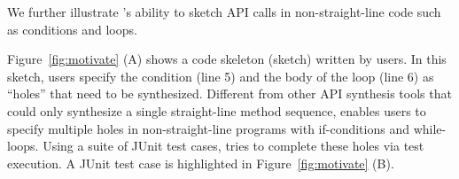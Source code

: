 We further illustrate \tool's ability to  sketch API calls in non-straight-line code such as conditions and loops.  


Figure~\ref{fig:motivate} (A)  shows a code skeleton (sketch) written by users. In this sketch, users specify the  condition (line 5) and the body of the  loop (line 6)  as ``holes'' that need to be synthesized. %
Different from other API synthesis tools  that could only synthesize a single straight-line method sequence, \tool enables users to specify multiple holes in non-straight-line programs with if-conditions and while-loops. Using a suite of JUnit test cases, \tool tries to complete these holes via test execution. A JUnit test case is highlighted in Figure~\ref{fig:motivate} (B).  



